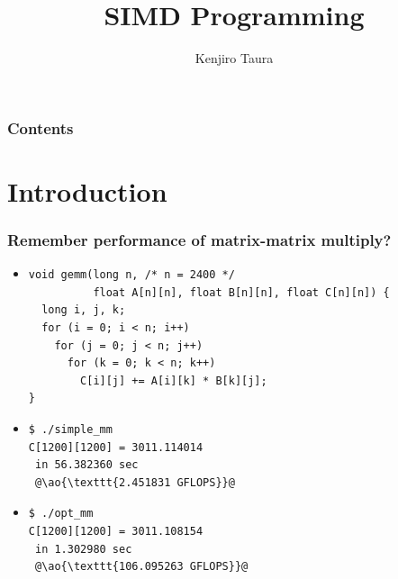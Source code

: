 \documentclass[12pt,dvipdfmx]{beamer}
\title{SIMD Programming}
\institute{}
\author{Kenjiro Taura}
\date{}
\newcommand{\ao}[1]{{\color{blue}#1}}
\begin{document}
\maketitle

\begin{frame}
\frametitle{Contents}
\tableofcontents
\end{frame}

\iffalse
\section{Introduction}

\begin{frame}[fragile]
\frametitle{Remember performance of matrix-matrix multiply?}

\begin{itemize}
\item []
\begin{lstlisting}
void gemm(long n, /* n = 2400 */
          float A[n][n], float B[n][n], float C[n][n]) {
  long i, j, k;
  for (i = 0; i < n; i++)
    for (j = 0; j < n; j++)
      for (k = 0; k < n; k++)
        C[i][j] += A[i][k] * B[k][j];
}
\end{lstlisting}


\item []
\begin{lstlisting}
$ ./simple_mm 
C[1200][1200] = 3011.114014
 in 56.382360 sec
 @\ao{\texttt{2.451831 GFLOPS}}@
\end{lstlisting} %

\item []
\begin{lstlisting}
$ ./opt_mm 
C[1200][1200] = 3011.108154
 in 1.302980 sec
 @\ao{\texttt{106.095263 GFLOPS}}@
\end{lstlisting} %
\end{itemize}

\end{frame}
\end{document}
